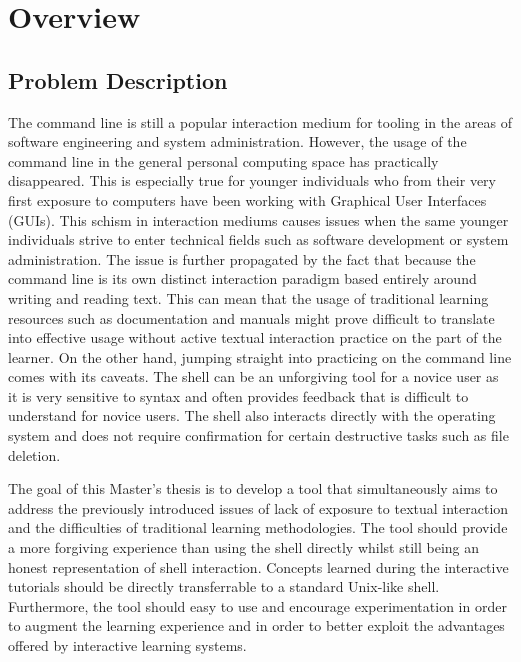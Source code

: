 \chapter{Overview}
\label{chap:overview}
\section{Problem Description}

The command line is still a popular interaction medium for tooling in the areas
of software engineering and system administration. However, the usage of the
command line in the general personal computing space has practically
disappeared. This is especially true for younger individuals who from their
very first exposure to computers have been working with Graphical User
Interfaces (GUIs). This schism in interaction mediums causes issues when the
same younger individuals strive to enter technical fields such as software
development or system administration. The issue is further propagated by the
fact that because the command line is its own distinct interaction paradigm
based entirely around writing and reading text. This can mean that the usage of
traditional learning resources such as documentation and manuals might prove
difficult to translate into effective usage without active textual interaction
practice on the part of the learner. On the other hand, jumping straight into
practicing on the command line comes with its caveats. The shell can be an
unforgiving tool for a novice user as it is very sensitive to syntax and often
provides feedback that is difficult to understand for novice users. The shell
also interacts directly with the operating system and does not require
confirmation for certain destructive tasks such as file deletion.

The goal of this Master's thesis is to develop a tool that simultaneously aims
to address the previously introduced issues of lack of exposure to textual
interaction and the difficulties of traditional learning methodologies. The
tool should provide a more forgiving experience than using the shell directly
whilst still being an honest representation of shell interaction. Concepts
learned during the interactive tutorials should be directly transferrable to a
standard Unix-like shell. Furthermore, the tool should easy to use and
encourage experimentation in order to augment the learning experience and in
order to better exploit the advantages offered by interactive learning systems.


